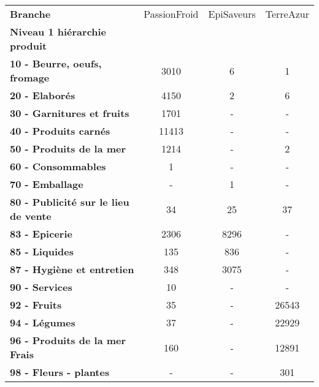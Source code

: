 \begin{tabular}{lccc}
\toprule
\textbf{Branche} & PassionFroid & EpiSaveurs & TerreAzur \\
\textbf{Niveau 1 hiérarchie produit        } &              &            &           \\
\midrule
\textbf{10 - Beurre, oeufs, fromage        } &         3010 &          6 &         1 \\
\textbf{20 - Elaborés                      } &         4150 &          2 &         6 \\
\textbf{30 - Garnitures et fruits          } &         1701 &          - &         - \\
\textbf{40 - Produits carnés               } &        11413 &          - &         - \\
\textbf{50 - Produits de la mer            } &         1214 &          - &         2 \\
\textbf{60 - Consommables                  } &            1 &          - &         - \\
\textbf{70 - Emballage                     } &            - &          1 &         - \\
\textbf{80 - Publicité sur le lieu de vente} &           34 &         25 &        37 \\
\textbf{83 - Epicerie                      } &         2306 &       8296 &         - \\
\textbf{85 - Liquides                      } &          135 &        836 &         - \\
\textbf{87 - Hygiène et entretien          } &          348 &       3075 &         - \\
\textbf{90 - Services                      } &           10 &          - &         - \\
\textbf{92 - Fruits                        } &           35 &          - &     26543 \\
\textbf{94 - Légumes                       } &           37 &          - &     22929 \\
\textbf{96 - Produits de la mer Frais      } &          160 &          - &     12891 \\
\textbf{98 - Fleurs - plantes              } &            - &          - &       301 \\
\bottomrule
\end{tabular}
